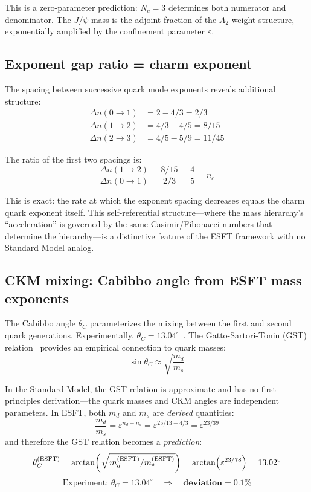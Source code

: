 ﻿\documentclass[twocolumn,preprintnumbers,amsmath,amssymb,prd]{revtex4-2}
\begin{document}
This is a zero-parameter prediction: $N_c = 3$ determines both numerator and denominator. The $J/\psi$ mass is the adjoint fraction of the $A_2$ weight structure, exponentially amplified by the confinement parameter $\varepsilon$.

\subsection{Exponent gap ratio = charm exponent}

The spacing between successive quark mode exponents reveals additional structure:
\begin{align}
\Delta n(0{\to}1) &= 2 - 4/3 = 2/3 \nonumber \\
\Delta n(1{\to}2) &= 4/3 - 4/5 = 8/15 \nonumber \\
\Delta n(2{\to}3) &= 4/5 - 5/9 = 11/45
\end{align}

The ratio of the first two spacings is:
\begin{equation}
\frac{\Delta n(1{\to}2)}{\Delta n(0{\to}1)} = \frac{8/15}{2/3} = \frac{4}{5} = n_c
\end{equation}

This is exact: the rate at which the exponent spacing decreases equals the charm quark exponent itself. This self-referential structure---where the mass hierarchy's ``acceleration'' is governed by the same Casimir/Fibonacci numbers that determine the hierarchy---is a distinctive feature of the ESFT framework with no Standard Model analog.

\subsection{CKM mixing: Cabibbo angle from ESFT mass exponents}

The Cabibbo angle $\theta_C$ parameterizes the mixing between the first and second quark generations. Experimentally, $\theta_C = 13.04^\circ$~\cite{PDG2024}. The Gatto-Sartori-Tonin (GST) relation~\cite{Gatto1968} provides an empirical connection to quark masses:
\begin{equation}
\sin\theta_C \approx \sqrt{\frac{m_d}{m_s}}
\end{equation}

In the Standard Model, the GST relation is approximate and has no first-principles derivation---the quark masses and CKM angles are independent parameters. In ESFT, both $m_d$ and $m_s$ are \emph{derived} quantities:
\begin{equation}
\frac{m_d}{m_s} = \varepsilon^{n_d - n_s} = \varepsilon^{25/13 - 4/3} = \varepsilon^{23/39}
\end{equation}
and therefore the GST relation becomes a \emph{prediction}:
\begin{equation}
\theta_C^{(\rm ESFT)} = \arctan\!\left(\sqrt{m_d^{(\rm ESFT)}/m_s^{(\rm ESFT)}}\right) = \arctan\!\left(\varepsilon^{23/78}\right) = 13.02^\circ
\end{equation}
\begin{equation}
\text{Experiment: } \theta_C = 13.04^\circ \quad \Rightarrow \quad \textbf{deviation} = 0.1\%
\end{equation}
\end{document}
